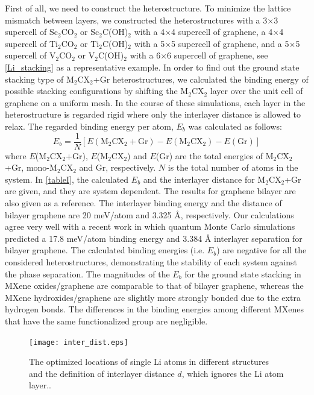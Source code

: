 First of all, we need to construct the heterostructure. To minimize the lattice mismatch between layers, we constructed the heterostructures with a 3$\times$3 supercell of Sc$_2$CO$_2$ or Sc$_2$C(OH)$_2$ with a 4$\times$4 supercell of graphene, a  4$\times$4 supercell of Ti$_2$CO$_2$ or Ti$_2$C(OH)$_2$ with a 5$\times$5 supercell of graphene, and a 5$\times$5 supercell of V$_2$CO$_2$ or V$_2$C(OH)$_2$ with a 6$\times$6 supercell of graphene, see \autoref{Li_stacking} as a representative example. In order to find out the ground state stacking type of M$_2$CX$_2$+Gr heterostructures, we calculated the binding energy of possible stacking configurations by shifting the M$_2$CX$_2$ layer over the unit cell of graphene on a uniform mesh. In the course of these simulations, each layer in the heterostructure is regarded rigid where only the interlayer distance is allowed to relax. The regarded binding energy per atom, $E_b$ was calculated as follows:
\begin{equation}
E_b=\frac{1}{N}[E(\mathrm{M}_2\mathrm{C}\mathrm{X}_2+\mathrm{Gr})-E(\mathrm{M}_2\mathrm{C}\mathrm{X}_2)-E(\mathrm{Gr})]
\end{equation}
where $E$(M$_2$CX$_2$+Gr), $E$(M$_2$CX$_2$) and $E$(Gr) are the total energies of M$_2$CX$_2$+Gr, mono-M$_2$CX$_2$ and Gr, respectively. $N$ is the total number of atoms in the system. In \autoref{tableI}, the calculated $E_b$ and the interlayer distance for M$_2$CX$_2$+Gr are given, and they are system dependent. The results for graphene bilayer are also given as a reference. The interlayer binding energy and the distance of bilayer graphene are 20 meV/atom and 3.325 {\AA}, respectively. Our calculations agree very well with a recent work in which quantum Monte Carlo simulations predicted a 17.8 meV/atom binding energy and 3.384 {\AA} interlayer separation for bilayer graphene\cite{PhysRevLett.115.115501}.  The calculated binding energies (i.e. $E_b$) are negative for all the considered heterostructures, demonstrating the stability of each system against the phase separation. The magnitudes of the $E_b$ for the ground state stacking in MXene oxides/graphene are comparable to that of bilayer graphene, whereas the MXene hydroxides/graphene are slightly more strongly bonded due to the extra hydrogen bonds. The differences in the binding energies among different MXenes that have the same functionalized group are negligible. 



\begin{figure}[htb]
\centering
\texttt{[image: inter\_dist.eps]}%
\caption{The optimized locations of single Li atoms in different structures and the definition of interlayer distance $d$, which ignores the Li atom layer.\label{inter-dist}.}
\end{figure}

